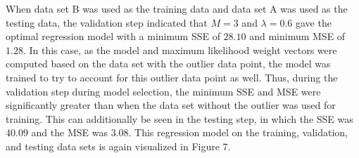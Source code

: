 \documentclass{article}
\begin{document}
When data set B was used as the training data and data set A was used as the testing data, the validation step indicated that $M = 3$ and $\lambda=0.6$ gave the optimal regression model with a minimum SSE of $28.10$ and minimum MSE of $1.28$. In this case, as the model and maximum likelihood weight vectors were computed based on the data set with the outlier data point, the model was trained to try to account for this outlier data point as well. Thus, during the validation step during model selection, the minimum SSE and MSE were significantly greater than when the data set without the outlier was used for training. This can additionally be seen in the testing step, in which the SSE was $40.09$ and the MSE was $3.08$. This regression model on the training, validation, and testing data sets is again visualized in Figure 7.
\end{document}
